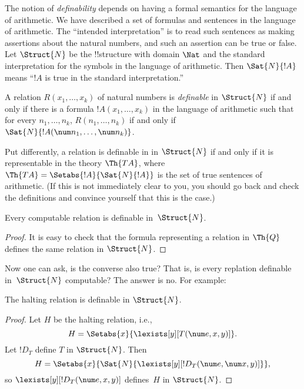 \documentclass[../../include/open-logic-section]{subfiles}
\begin{document}


The notion of {\em definability} depends on having a formal semantics
for the language of arithmetic.  We have described a set of formulas
and sentences in the language of arithmetic. The ``intended
interpretation'' is to read such sentences as making assertions about
the natural numbers, and such an assertion can be true or false. Let
$\Struct{N}$ be the !!{structure} with domain $\Nat$ and the standard
interpretation for the symbols in the language of arithmetic.  Then
$\Sat{N}{!A}$ means ``$!A$ is true in the standard interpretation.''

\begin{defn}
  A relation $R(x_1,\dots,x_k)$ of natural numbers is {\em definable}
  in $\Struct{N}$ if and only if there is a formula $!A(x_1,\dots,x_k)$
  in the language of arithmetic such that for every $n_1,\dots,n_k$,
  $R(n_1,\dots,n_k)$ if and only if $\Sat{N}{!A(\num
  n_1,\dots,\num n_k)}$.
\end{defn}
Put differently, a relation is definable in in $\Struct{N}$ if and
only if it is representable in the theory $\Th{TA}$, where $\Th{TA} =
\Setabs{!A}{\Sat{N}{!A}}$ is the set of true sentences of
arithmetic. (If this is not immediately clear to you, you should go
back and check the definitions and convince yourself that this is the
case.)

\begin{lem}
Every computable relation is definable in~$\Struct{N}$.
\end{lem}

\begin{proof}
It is easy to check that the formula representing a relation in
$\Th{Q}$ defines the same relation in $\Struct{N}$. 
\end{proof}

Now one can ask, is the converse also true?  That is, is every
replation definable in~$\Struct{N}$ computable? The answer is no. For
example:

\begin{lem}
The halting relation is definable in $\Struct{N}$.
\end{lem}

\begin{proof}
Let $H$ be the halting relation, i.e.,
\[
H = \Setabs{x}{\lexists[y][T(\num e, x, y)]}.
\]
Let $!D_T$ define $T$ in $\Struct{N}$. Then
\[
H = \Setabs{x}{\Sat{N}{\lexists[y][!D_T(\num e, \num x, y)]}},
\]
so $\lexists[y][!D_T(\num e, x, y)]$ defines~$H$ in $\Struct{N}$. 
\end{proof}
\end{document}
